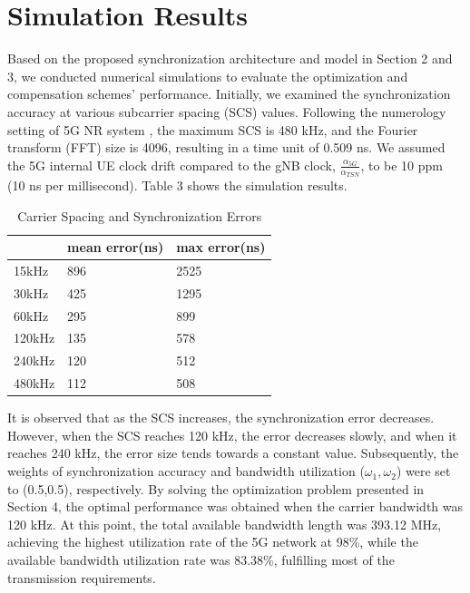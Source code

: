 \documentclass[english]{cccconf}
\begin{document}
\section{Simulation Results}
Based on the proposed synchronization architecture and model in Section 2 and 3, we conducted numerical simulations to evaluate the optimization and compensation schemes' performance. Initially, we examined the synchronization accuracy at various subcarrier spacing (SCS) values. Following the numerology setting of 5G NR system \cite{access2015requirements}, the maximum SCS is 480 kHz, and the Fourier transform (FFT) size is 4096, resulting in a time unit of 0.509 ns. We assumed the 5G internal UE clock drift compared to the gNB clock, $\frac{\alpha_{5G}}{\alpha_{TSN}}$, to be 10 ppm (10 ns per millisecond). Table 3 shows the simulation results.

\begin{table}[!htb]
	\centering
	\caption{Carrier Spacing and Synchronization Errors}
	\label{tab1}
	\begin{tabular}{l|l|l}
		\hline
		 & \textbf{mean error(ns)}& \textbf{max error(ns)} \\
		\hline
		15kHz 
		& 896
		& 2525 \\
		\hline
		30kHz
		& 425
		& 1295 \\
		\hline
		60kHz
		& 295
		& 899 \\
		\hline
		120kHz
		& 135
		& 578 \\
		\hline
		240kHz
		& 120
		& 512 \\
		\hline
			480kHz
		& 112
		& 508 \\
		\hline
	\end{tabular}
\end{table}


It is observed that as the SCS increases, the synchronization error decreases. However, when the SCS reaches 120 kHz, the error decreases slowly, and when it reaches 240 kHz, the error size tends towards a constant value. Subsequently, the weights of synchronization accuracy and bandwidth utilization ($\omega_1,\omega_2$) were set to (0.5,0.5), respectively. By solving the optimization problem presented in Section 4, the optimal performance was obtained when the carrier bandwidth was 120 kHz. At this point, the total available bandwidth length was 393.12 MHz, achieving the highest utilization rate of the 5G network at 98\%, while the available bandwidth utilization rate was 83.38\%, fulfilling most of the transmission requirements.
\end{document}
